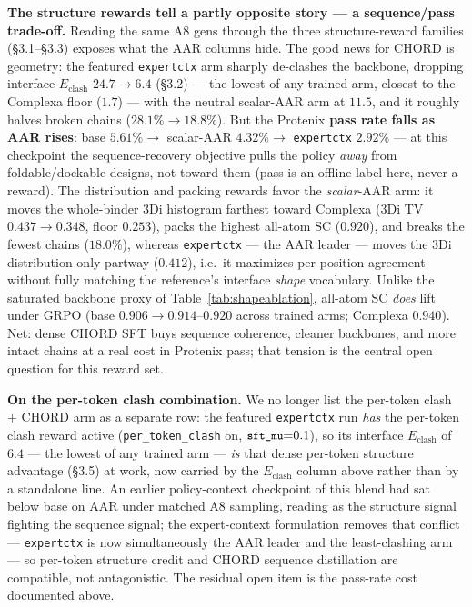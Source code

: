 \documentclass[11pt]{article}
\newcommand{\ttk}[1]{\texttt{\small #1}}
\begin{document}
\textbf{The structure rewards tell a partly opposite story --- a sequence/pass trade-off.}
Reading the same A8 gens through the three structure-reward families (\S3.1--\S3.3) exposes what the AAR
columns hide. The good news for CHORD is geometry: the featured \ttk{expertctx} arm sharply de-clashes the
backbone, dropping interface $E_{\mathrm{clash}}$ $24.7\!\to\!6.4$ (\S3.2) --- the lowest of any trained
arm, closest to the Complexa floor ($1.7$) --- with the neutral scalar-AAR arm at $11.5$, and it roughly
halves broken chains ($28.1\%\!\to\!18.8\%$). But the Protenix \textbf{pass rate falls as AAR rises}:
base $5.61\%\to$ scalar-AAR $4.32\%\to$ \ttk{expertctx} $2.92\%$ --- at this checkpoint the
sequence-recovery objective pulls the policy \emph{away} from foldable/dockable designs, not toward them
(pass is an offline label here, never a reward). The distribution and packing rewards favor the
\emph{scalar}-AAR arm: it moves the whole-binder 3Di histogram farthest toward Complexa (3Di TV
$0.437\!\to\!0.348$, floor $0.253$), packs the highest all-atom SC ($0.920$), and breaks the fewest chains
($18.0\%$), whereas \ttk{expertctx} --- the AAR leader --- moves the 3Di distribution only partway
($0.412$), i.e.\ it maximizes per-position agreement without fully matching the reference's interface
\emph{shape} vocabulary. Unlike the saturated backbone proxy of Table~\ref{tab:shapeablation}, all-atom SC
\emph{does} lift under GRPO (base $0.906\!\to\!0.914$--$0.920$ across trained arms; Complexa $0.940$). Net:
dense CHORD SFT buys sequence coherence, cleaner backbones, and more intact chains at a real cost in
Protenix pass; that tension is the central open question for this reward set.

\textbf{On the per-token clash combination.} We no longer list the per-token clash $+$ CHORD arm as a
separate row: the featured \ttk{expertctx} run \emph{has} the per-token clash reward active
(\ttk{per\_token\_clash} on, $\ttk{sft\_mu}{=}0.1$), so its interface $E_{\mathrm{clash}}$ of $6.4$ --- the
lowest of any trained arm --- \emph{is} that dense per-token structure advantage (\S3.5) at work, now
carried by the $E_{\mathrm{clash}}$ column above rather than by a standalone line. An earlier
policy-context checkpoint of this blend had sat below base on AAR under matched A8 sampling, reading as the
structure signal fighting the sequence signal; the expert-context formulation removes that conflict ---
\ttk{expertctx} is now simultaneously the AAR leader and the least-clashing arm --- so per-token structure
credit and CHORD sequence distillation are compatible, not antagonistic. The residual open item is the
pass-rate cost documented above.
\end{document}
